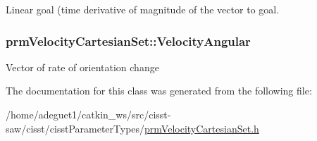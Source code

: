 Linear goal (time derivative of magnitude of the vector to goal. \hypertarget{classprm_velocity_cartesian_set_a9d72325c32e55acfe48be69131f34fc3}{
\subsubsection[{Velocity\-Angular}]{ prm\-Velocity\-Cartesian\-Set\-::\-Velocity\-Angular\hspace{0.3cm}{\ttfamily [protected]}}}\label{classprm_velocity_cartesian_set_a9d72325c32e55acfe48be69131f34fc3}
Vector of rate of orientation change 

The documentation for this class was generated from the following file\-:\begin{DoxyCompactItemize}
\item 
/home/adeguet1/catkin\-\_\-ws/src/cisst-\/saw/cisst/cisst\-Parameter\-Types/\hyperlink{prm_velocity_cartesian_set_8h}{prm\-Velocity\-Cartesian\-Set.\-h}\end{DoxyCompactItemize}
